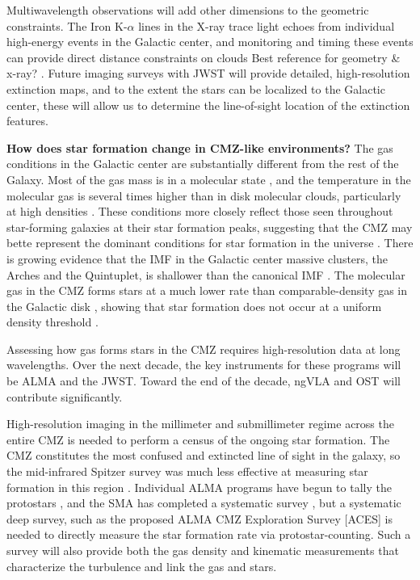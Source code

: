 \documentclass[modern]{aastex62}
\def\agnote#1{{\color{red}#1}}
\begin{document}
Multiwavelength observations will add other dimensions to the geometric constraints.
The Iron K-$\alpha$ lines in the X-ray trace light echoes from individual high-energy
events in the Galactic center, and monitoring and timing these events can
provide direct distance constraints on clouds \agnote{Best reference for
geometry \& x-ray?} \citep[e.g.][]{Terrier2018a}.  Future imaging surveys with JWST
will provide detailed, high-resolution extinction maps, and to the extent the stars
can be localized to the Galactic center, these will allow us to determine the line-of-sight
location of the extinction features.


\textbf{How does star formation change in CMZ-like environments?}
The gas conditions in the Galactic center are substantially different from the rest of the Galaxy.
Most of the gas mass is in a molecular state \citep[need to cite others][]{Mills2017a}, and the temperature in the molecular gas is several times
higher than in disk molecular clouds, particularly at high densities \citep{Ao2013a,Ginsburg2016a,Krieger2017a}.
These conditions more closely reflect those seen throughout star-forming galaxies at their star formation
peaks, suggesting that the CMZ may bette represent the dominant conditions for star formation in the universe
\citep{Kruijssen2013a}.
There is growing evidence that the IMF in the Galactic center massive clusters, the Arches and the Quintuplet,
is shallower than the canonical IMF \citep{Hosek2018a}.  The molecular gas in the CMZ forms stars at a much
lower rate than comparable-density gas in the Galactic disk \citep{Longmore2013b}, showing that star formation
does not occur at a uniform density threshold \citep{Walker2017a,Barnes2017b,Ginsburg2018a}.

Assessing how gas forms stars in the CMZ requires high-resolution data at long wavelengths.  Over the next
decade, the key instruments for these programs will be ALMA and the JWST.  Toward the end of the decade,
ngVLA and OST will contribute significantly.

High-resolution imaging in the millimeter and submillimeter regime across the entire CMZ is needed to perform
a census of the ongoing star formation.  The CMZ constitutes the most confused and extincted line of sight
in the galaxy, so the mid-infrared Spitzer survey was much less effective at measuring star formation in
this region \citep{Koepferl2104a}.  Individual ALMA programs have begun to
tally the protostars \citep[I'd like to cite others here, but it's all still in
prep, right?]{Ginsburg2018a}, and the SMA has completed a systematic survey
\citep{Battersby2016a}, but a systematic deep survey, such as the proposed ALMA CMZ Exploration Survey [ACES]
is needed to directly measure the star formation rate via protostar-counting.  Such a survey will also provide
both the gas density and kinematic measurements that characterize the turbulence and link the gas and stars.
\end{document}
